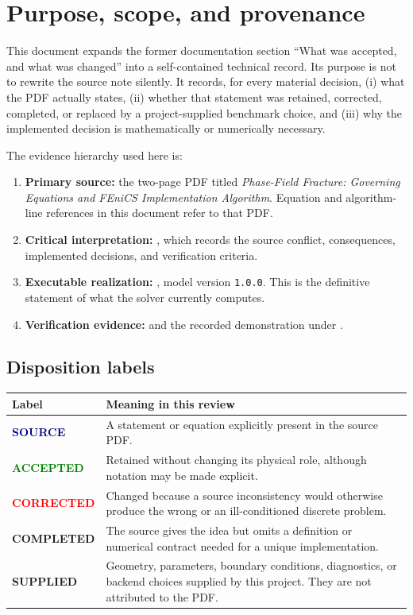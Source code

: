 \documentclass[11pt,a4paper]{article}
\newcommand{\code}[1]{\texttt{#1}}
\newcommand{\SourceTag}{\colorbox{PaleBlue}{\textcolor{Navy}{\scriptsize\bfseries SOURCE}}}
\newcommand{\AcceptedTag}{\colorbox{PaleTeal}{\textcolor{Green}{\scriptsize\bfseries ACCEPTED}}}
\newcommand{\CorrectedTag}{\colorbox{PaleRed}{\textcolor{Red}{\scriptsize\bfseries CORRECTED}}}
\newcommand{\CompletedTag}{\colorbox{PaleAmber}{\textcolor{Amber}{\scriptsize\bfseries COMPLETED}}}
\newcommand{\AddedTag}{\colorbox{PaleGray}{\textcolor{Slate}{\scriptsize\bfseries SUPPLIED}}}
\begin{document}
\hypersetup{pageanchor=true}
\tableofcontents
\clearpage
{}

\section{Purpose, scope, and provenance}

This document expands the former documentation section ``What was accepted,
and what was changed'' into a self-contained technical record. Its purpose is
not to rewrite the source note silently. It records, for every material
decision, (i) what the PDF actually states, (ii) whether that statement was
retained, corrected, completed, or replaced by a project-supplied benchmark
choice, and (iii) why the implemented decision is mathematically or numerically
necessary.

The evidence hierarchy used here is:

\begin{enumerate}
  \item \textbf{Primary source:} the two-page PDF titled
    \emph{Phase-Field Fracture: Governing Equations and FEniCS Implementation
    Algorithm}. Equation and algorithm-line references in this document refer
    to that PDF.
  \item \textbf{Critical interpretation:} ,
    which records the source conflict, consequences, implemented decisions,
    and verification criteria.
  \item \textbf{Executable realization:} , model
    version \code{1.0.0}. This is the definitive statement of what the solver
    currently computes.
  \item \textbf{Verification evidence:} 
    and the recorded demonstration under .
\end{enumerate}

\subsection{Disposition labels}

\begin{tabularx}{\textwidth}{@{}L{37mm}Y@{}}
\toprule
\textbf{Label} & \textbf{Meaning in this review} \\
\midrule
\SourceTag & A statement or equation explicitly present in the source PDF. \\
\AcceptedTag & Retained without changing its physical role, although notation
may be made explicit. \\
\CorrectedTag & Changed because a source inconsistency would otherwise produce
the wrong or an ill-conditioned discrete problem. \\
\CompletedTag & The source gives the idea but omits a definition or numerical
contract needed for a unique implementation. \\
\AddedTag & Geometry, parameters, boundary conditions, diagnostics, or backend
choices supplied by this project. They are not attributed to the PDF. \\
\bottomrule
\end{tabularx}
\end{document}
